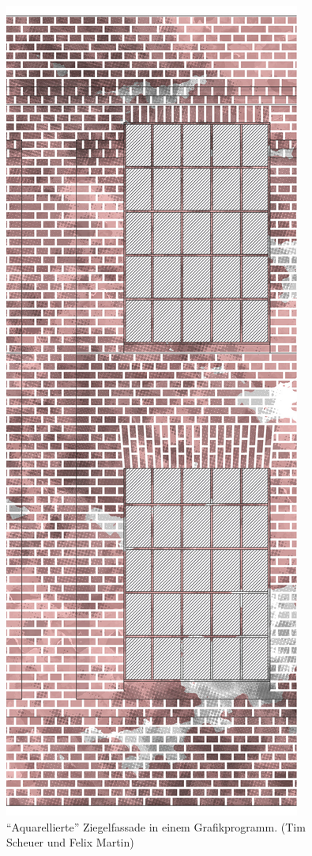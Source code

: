 \begin{figure}
\centering
  \includegraphics[width=\linewidth]{bilder/vektor_darstellungsmoeglichkeiten.jpg}
	\caption{"`Aquarellierte"' Ziegelfassade in einem Grafikprogramm. (Tim Scheuer und Felix Martin)}
	\label{abb:vektor_darstellungsmoeglichkeiten}
\end{figure}
